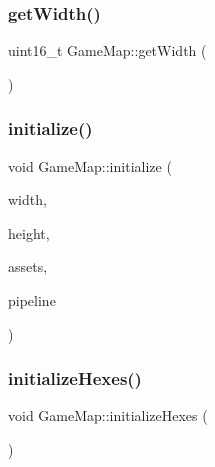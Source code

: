 \subsubsection{\texorpdfstring{get\+Width()}{getWidth()}}
{\footnotesize\ttfamily uint16\+\_\+t Game\+Map\+::get\+Width (\begin{DoxyParamCaption}{ }\end{DoxyParamCaption})\hspace{0.3cm}{\ttfamily [inline]}}

\mbox{\label{class_game_map_ad45871c8fe5b4de49862b433a787976f}} 
\subsubsection{\texorpdfstring{initialize()}{initialize()}}
{\footnotesize\ttfamily void Game\+Map\+::initialize (\begin{DoxyParamCaption}\item[{uint16\+\_\+t}]{width,  }\item[{uint16\+\_\+t}]{height,  }\item[{\hyperlink{class_asset_manager}{Asset\+Manager} $\ast$}]{assets,  }\item[{\hyperlink{class_pipeline}{Pipeline} $\ast$}]{pipeline }\end{DoxyParamCaption})}

\mbox{\label{class_game_map_ad0de88300a253f8a9ec7dc784b2bf950}} 
\subsubsection{\texorpdfstring{initialize\+Hexes()}{initializeHexes()}}
{\footnotesize\ttfamily void Game\+Map\+::initialize\+Hexes (\begin{DoxyParamCaption}{ }\end{DoxyParamCaption})\hspace{0.3cm}{\ttfamily [private]}}

\mbox{\label{class_game_map_a2671aab9bbbdb130b33d8b3aa0bb0d87}} 
